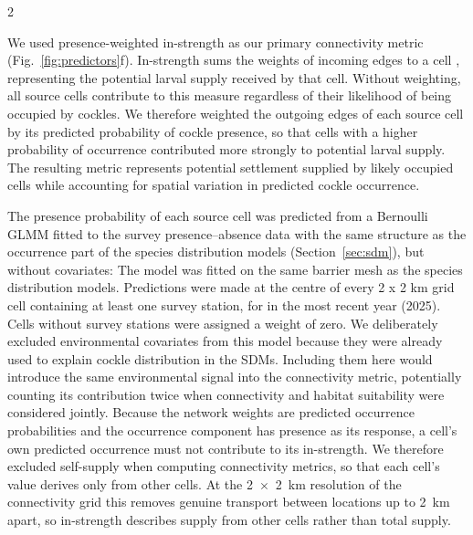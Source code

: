 \begin{spacing}{2}
    
We used presence-weighted in-strength as our primary connectivity metric (Fig.~\ref{fig:predictors}f). In-strength sums the weights of incoming edges to a cell \citep{squartiniReciprocityWeightedNetworks2013}, representing the potential larval supply received by that cell. Without weighting, all source cells contribute to this measure regardless of their likelihood of being occupied by cockles. We therefore weighted the outgoing edges of each source cell by its predicted probability of cockle presence, so that cells with a higher probability of occurrence contributed more strongly to potential larval supply. The resulting metric represents potential settlement supplied by likely occupied cells while accounting for spatial variation in predicted cockle occurrence.

The presence probability of each source cell was predicted from a Bernoulli GLMM fitted to the survey presence--absence data with the same structure as the occurrence part of the species distribution models (Section~\ref{sec:sdm}), but without covariates:  The model was fitted on the same barrier mesh as the species distribution models. Predictions were made at the centre of every 2 x 2 km grid cell containing at least one survey station, for  in the most recent year (2025).
Cells without survey stations were assigned a weight of zero. We deliberately excluded environmental covariates from this model because they were already used to explain cockle distribution in the SDMs. Including them here would introduce the same environmental signal into the connectivity metric, potentially counting its contribution twice when connectivity and habitat suitability were considered jointly. Because the network weights are predicted occurrence probabilities and the occurrence component has presence as its response, a cell's own predicted occurrence must not contribute to its in-strength. We therefore excluded self-supply when computing connectivity metrics, so that each cell's value derives only from other cells. At the 2~$\times$~2~km resolution of the connectivity grid this removes genuine transport between locations up to 2~km apart, so in-strength describes supply from other cells rather than total supply.


\end{spacing}
